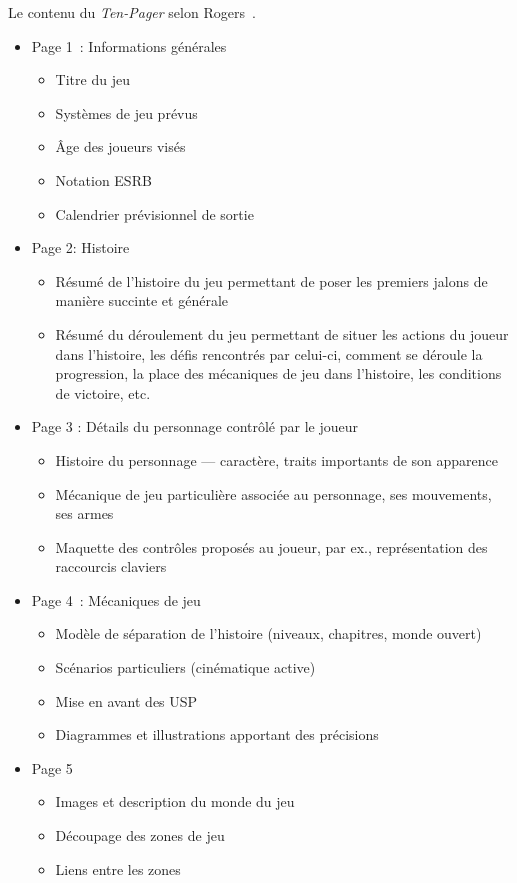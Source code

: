 \vfill


\begin{table}
\caption{Le contenu du \emph{Ten-Pager} selon Rogers~\cite{LevelUpRogers2014}.}
\footnotesize
\begin{framed}
\begin{itemize}
    \item Page 1~: Informations générales
    \begin{itemize}
        \item Titre du jeu
        \item Systèmes de jeu prévus
        \item \^Age des joueurs visés
        \item Notation ESRB
        \item Calendrier prévisionnel de sortie
    \end{itemize}
    \item Page 2: Histoire
    \begin{itemize}
        \item  Résumé de l'histoire du jeu permettant de poser les premiers jalons de manière succinte et générale
        \item Résumé du déroulement du jeu  permettant de situer les actions du joueur dans l'histoire, les d\'efis rencontrés par celui-ci, comment se déroule la progression, la place des mécaniques de jeu dans l'histoire, les conditions de victoire, etc.
    \end{itemize}
    \item Page 3 : Détails du personnage contr\^olé par le joueur
    \begin{itemize}
        \item Histoire du personnage --- caractère, traits importants de son apparence
        \item Mécanique de jeu particulière associée au personnage, ses mouvements, ses armes
        \item Maquette des contrôles proposés au joueur, par ex., représentation des raccourcis claviers
    \end{itemize}
    \item Page 4~: Mécaniques de jeu
    \begin{itemize}
        \item Modèle de séparation de l'histoire (niveaux, chapitres, monde ouvert)
        \item Scénarios particuliers (cinématique active)
        \item Mise en avant des USP
        \item Diagrammes et illustrations apportant des précisions
    \end{itemize}
    \item Page 5
    \begin{itemize}
        \item Images et description du monde du jeu
        \item Découpage des zones de jeu
        \item Liens entre les zones
    \end{itemize}


\end{itemize}
\end{framed}
\end{table}
